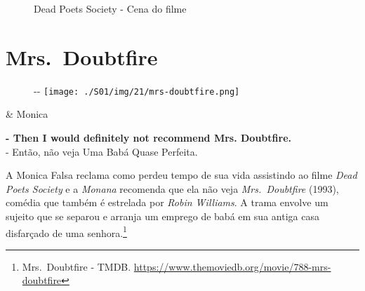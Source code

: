 \begin{figure}
  \centering
    \caption{Dead Poets Society - Cena do filme\label{fig:dead-poets-society-cena-do-filme}}
\end{figure}

\hypertarget{mrs.-doubtfire}{%
\section{Mrs.~Doubtfire}\label{mrs.-doubtfire}}

\begin{figure}[!ht]
  \begin{adjustwidth}{-\oddsidemargin-1in}{-\rightmargin}
    \centering
    \texttt{[image: ./S01/img/21/mrs-doubtfire.png]}
  \end{adjustwidth}
\end{figure}

\begin{tcolorbox}[enhanced,center upper,
    drop fuzzy shadow southeast, boxrule=0.3pt,
    lower separated=false, breakable,
    colframe=black!30!dialogoBorder,colback=white]
\begin{minipage}[c]{0.16\linewidth}
   & \centering \scriptsize{Monica}
\end{minipage}
\hfill
\begin{minipage}[c]{0.8\linewidth}
  \textbf{- Then I would definitely not recommend Mrs. Doubtfire.}\\
  - Então, não veja Uma Babá Quase Perfeita.
\end{minipage}
\end{tcolorbox}

A Monica Falsa reclama como perdeu tempo de sua vida assistindo ao filme
\emph{Dead Poets Society} e a \emph{Monana} recomenda que ela não veja
\emph{Mrs.~Doubtfire} (1993), comédia que também é estrelada por
\emph{Robin Williams}. A trama envolve um sujeito que se separou e
arranja um emprego de babá em sua antiga casa disfarçado de uma
senhora.\footnote{\sloppy Mrs. Doubtfire - TMDB. \url{https://www.themoviedb.org/movie/788-mrs-doubtfire}}

